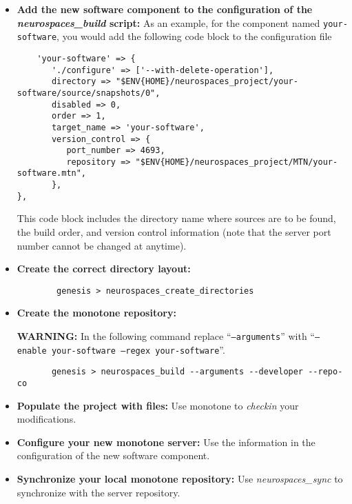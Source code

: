 \documentclass[12pt]{article}
\begin{document}
\begin{itemize}
	\item {\bf Add the new software component to the configuration of the {\it neurospaces\_build} script:} As an example, for the component named {\tt your-software}, you would add the following code block to the configuration file
	\begin{footnotesize}
	\begin{verbatim}
	'your-software' => {
	   './configure' => ['--with-delete-operation'],
	   directory => "$ENV{HOME}/neurospaces_project/your-software/source/snapshots/0",
	   disabled => 0,
	   order => 1,
	   target_name => 'your-software',
	   version_control => {
	      port_number => 4693,
	      repository => "$ENV{HOME}/neurospaces_project/MTN/your-software.mtn",
	   },
},
	\end{verbatim}
	\end{footnotesize}
	This code block includes the directory name where sources are to be found, the build order, and version control information 
	(note that the server port number cannot be changed at anytime).

	\item {\bf Create the correct directory layout:}
	\begin{verbatim}
		genesis > neurospaces_create_directories
	\end{verbatim}
	
	\item {\bf Create the monotone repository:}
	
	{\bf WARNING:} In the following command replace ``{\tt --arguments}'' with ``{\tt --enable your-software --regex your-software}''.

	\begin{verbatim}
	   genesis > neurospaces_build --arguments --developer --repo-co
	\end{verbatim}

	\item {\bf Populate the project with files:} Use monotone to {\it checkin} your modifications.

	\item {\bf Configure your new monotone server:} Use the information in the configuration of the new software component.
	
	\item {\bf Synchronize your local monotone repository:} Use {\it neurospaces\_sync} to synchronize with the server repository.
	
\end{itemize} 
\end{document}
